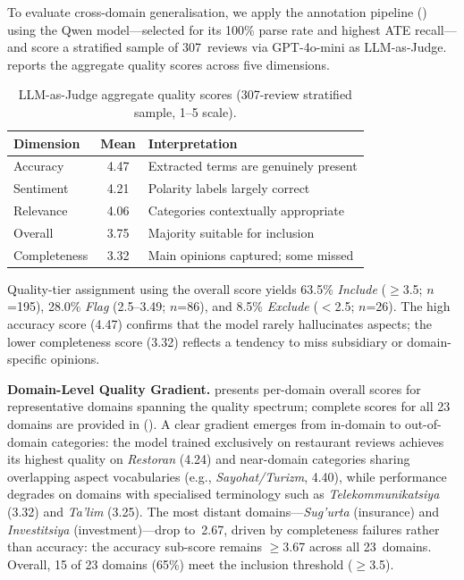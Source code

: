 \documentclass[computers,article,submit,pdftex,moreauthors]{Definitions/mdpi}
\begin{document}
To evaluate cross-domain generalisation, we apply the annotation pipeline () using the Qwen model---selected for its 100\% parse rate and highest ATE recall---and score a stratified sample of 307~reviews via GPT-4o-mini as LLM-as-Judge.  reports the aggregate quality scores across five dimensions.

\begin{table}[t]
\centering
\caption{LLM-as-Judge aggregate quality scores (307-review stratified sample, 1--5 scale).}
\label{tab:judge_agg}
\begin{tabular}{lc l}
\toprule
\textbf{Dimension} & \textbf{Mean} & \textbf{Interpretation} \\
\midrule
Accuracy     & 4.47 & Extracted terms are genuinely present \\
Sentiment    & 4.21 & Polarity labels largely correct \\
Relevance    & 4.06 & Categories contextually appropriate \\
Overall      & 3.75 & Majority suitable for inclusion \\
Completeness & 3.32 & Main opinions captured; some missed \\
\bottomrule
\end{tabular}
\end{table}

Quality-tier assignment using the overall score yields 63.5\% \emph{Include} ($\geq$3.5; $n$=195), 28.0\% \emph{Flag} (2.5--3.49; $n$=86), and 8.5\% \emph{Exclude} ($<$2.5; $n$=26). The high accuracy score (4.47) confirms that the model rarely hallucinates aspects; the lower completeness score (3.32) reflects a tendency to miss subsidiary or domain-specific opinions.

\textbf{Domain-Level Quality Gradient.}  presents per-domain overall scores for representative domains spanning the quality spectrum; complete scores for all 23 domains are provided in  (). A clear gradient emerges from in-domain to out-of-domain categories: the model trained exclusively on restaurant reviews achieves its highest quality on \emph{Restoran} (4.24) and near-domain categories sharing overlapping aspect vocabularies (e.g., \emph{Sayohat/Turizm}, 4.40), while performance degrades on domains with specialised terminology such as \emph{Telekommunikatsiya} (3.32) and \emph{Ta'lim} (3.25). The most distant domains---\emph{Sug'urta} (insurance) and \emph{Investitsiya} (investment)---drop to~2.67, driven by completeness failures rather than accuracy: the accuracy sub-score remains $\geq$3.67 across all 23~domains. Overall, 15 of 23 domains (65\%) meet the inclusion threshold ($\geq$3.5).
\end{document}
